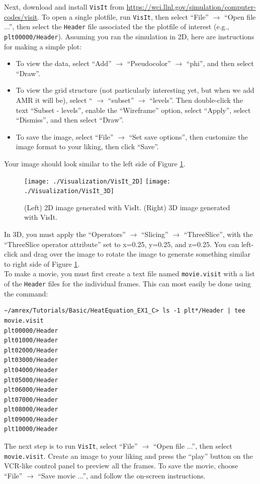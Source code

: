 Next, download and install {\tt VisIt} from \url{https://wci.llnl.gov/simulation/computer-codes/visit}.
To open a single plotfile, run {\tt VisIt}, then select ``File'' $\rightarrow$ ``Open file ...'',
then select the {\tt Header} file associated the the plotfile of interest (e.g., {\tt plt00000/Header}).
Assuming you ran the simulation in 2D, here are instructions for making a simple plot:
\begin{itemize}
\item To view the data, select ``Add'' $\rightarrow$ ``Pseudocolor'' $\rightarrow$ ``phi'', and then select
``Draw''.
\item To view the grid structure (not particularly interesting yet, but when we add AMR it will be), select
`` $\rightarrow$ ``subset'' $\rightarrow$ ``levels''.  Then double-click the text ``Subset - levels'',
enable the ``Wireframe'' option, select ``Apply'', select ``Dismiss'', and then select ``Draw''.
\item To save the image, select ``File'' $\rightarrow$ ``Set save options'', then customize the image format
to your liking, then click ``Save''.
\end{itemize}
Your image should look similar to the left side of Figure \ref{Fig:VisIt}.\\
\begin{figure}[tb]
\centering
\texttt{[image: ./Visualization/VisIt\_2D]}
\texttt{[image: ./Visualization/VisIt\_3D]}
\caption{(Left) 2D image generated with VisIt.  (Right) 3D image generated with VisIt.}
\label{Fig:VisIt}
\end{figure}

In 3D, you must apply the ``Operators'' $\rightarrow$ ``Slicing'' $\rightarrow$ ``ThreeSlice'', with the 
``ThreeSlice operator attribute'' set to x=0.25, y=0.25, and z=0.25.  You can left-click and drag
over the image to rotate the image to generate something similar to right side of Figure \ref{Fig:VisIt}.\\

To make a movie, you must first create a text file named {\tt movie.visit} with a list of the {\tt Header} 
files for the individual frames.  This can most easily be done using the command:
\begin{lstlisting}[backgroundcolor=\color{light-red}]
~/amrex/Tutorials/Basic/HeatEquation_EX1_C> ls -1 plt*/Header | tee movie.visit
plt00000/Header
plt01000/Header
plt02000/Header
plt03000/Header
plt04000/Header
plt05000/Header
plt06000/Header
plt07000/Header
plt08000/Header
plt09000/Header
plt10000/Header
\end{lstlisting}
The next step is to run {\tt VisIt}, select ``File'' $\rightarrow$ ``Open file ...'',
then select {\tt movie.visit}.  Create an image to your liking and press the ``play'' button
on the VCR-like control panel to preview all the frames.  To save the movie, choose
``File'' $\rightarrow$ ``Save movie ...'', and follow the on-screen instructions.

